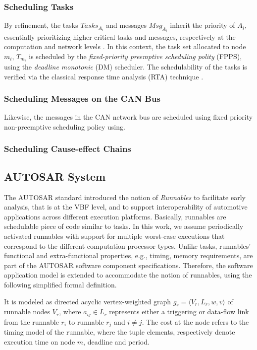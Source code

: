 \subsubsection{Scheduling Tasks}
By refinement, the tasks $Tasks_{A_i}$ and messages $Msg_{A_i}$ inherit the priority of $A_i$, essentially prioritizing higher critical tasks and messages, respectively at the computation and network levels \cite{Baruah2011Response-timeSystems,Burns2013MixedNetwork}. In this context, the task set allocated to node $m_i$, $T_{m_i}$ is scheduled by the \textit{fixed-priority preemptive scheduling polity} (FPPS), using the \textit{deadline monotonic} (DM) scheduler. The schedulability of the tasks is verified via the classical response time analysis (RTA) technique \cite{Baruah2011Response-timeSystems}. 

\subsubsection{Scheduling Messages on the CAN Bus}
Likewise, the messages in the CAN network bus are scheduled using fixed priority non-preemptive scheduling policy using.

\subsubsection{Scheduling Cause-effect Chains}

\subsection{AUTOSAR System}
The AUTOSAR standard introduced the notion of \textit{Runnables} to facilitate early analysis, that is at the VBF level, and to support interoperability of automotive applications across different execution platforms. Basically, runnables are schedulable piece of code similar to tasks. In this work, we assume periodically activated runnables with support for multiple worst-case executions that correspond to the different computation processor types. Unlike tasks, runnables' functional and extra-functional properties, e.g., timing, memory requirements, are part of the AUTOSAR software component specifications. Therefore, the software application model is extended to accommodate the notion of runnables, using the following simplified formal definition.

\begin{definition}
It is modeled as directed acyclic vertex-weighted graph $g_r=\langle V_r, L_r, w, v\rangle$ of runnable nodes $V_r$, where $a_{ij}\in L_r$ represents either a triggering or data-flow link from the runnable $r_i$ to runnable $r_j$ and $i\neq j$. The cost at the node refers to the timing model of the runnable, where the tuple elements, respectively denote execution time on node $m$, deadline and period. 
\end{definition}

